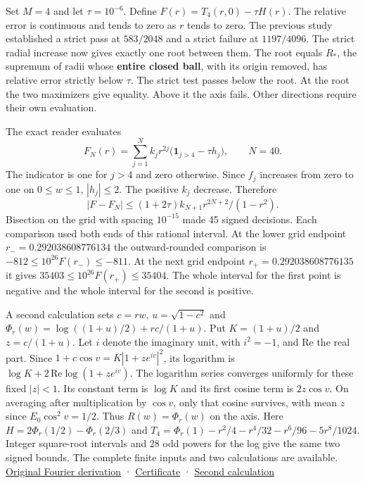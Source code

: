 Set \(M=4\) and let \(\tau=10^{-6}\). Define \(F(r)=T_4(r,0)-\tau H(r)\). The relative error is continuous and tends to zero as \(r\) tends to zero. The previous study established a strict pass at \(583/2048\) and a strict failure at \(1197/4096\). The strict radial increase now gives exactly one root between them. The root equals \(R_*\), the supremum of radii whose \textbf{entire closed ball}, with its origin removed, has relative error strictly below \(\tau\). The strict test passes below the root. At the root the two maximizers give equality. Above it the axis fails. Other directions require their own evaluation.

The exact reader evaluates \[
F_N(r)=\sum_{j=1}^{N} k_j r^{2j}\bigl(\mathbf{1}_{j>4}-\tau h_j\bigr),\qquad N=40 .
\] The indicator is one for \(j>4\) and zero otherwise. Since \(f_j\) increases from zero to one on \(0\le w\le1\), \(|h_j|\le2\). The positive \(k_j\) decrease. Therefore \[
|F-F_N|\le (1+2\tau)k_{N+1}r^{2N+2}/(1-r^2).
\] Bisection on the grid with spacing \(10^{-15}\) made 45 signed decisions. Each comparison used both ends of this rational interval. At the lower grid endpoint \(r_-=0.292038608776134\) the outward-rounded comparison is \(-812\le 10^{26}F(r_-)\le-811\). At the next grid endpoint \(r_+=0.292038608776135\) it gives \(35403\le 10^{26}F(r_+)\le35404\). The whole interval for the first point is negative and the whole interval for the second is positive.

A second calculation sets \(c=rw\), \(u=\sqrt{1-c^2}\) and \(\Phi_r(w)=\log((1+u)/2)+rc/(1+u)\). Put \(K=(1+u)/2\) and \(z=c/(1+u)\). Let \(i\) denote the imaginary unit, with \(i^2=-1\), and \(\mathrm{Re}\) the real part. Since \(1+c\cos v=K|1+ze^{iv}|^2\), its logarithm is \(\log K+2\,\mathrm{Re}\log(1+ze^{iv})\). The logarithm series converges uniformly for these fixed \(|z|<1\). Its constant term is \(\log K\) and its first cosine term is \(2z\cos v\). On averaging after multiplication by \(\cos v\), only that cosine survives, with mean \(z\) since \(E_0\cos^2v=1/2\). Thus \(R(w)=\Phi_r(w)\) on the axis. Here \(H=2\Phi_r(1/2)-\Phi_r(2/3)\) and \(T_4=\Phi_r(1)-r^2/4-r^4/32-r^6/96-5r^8/1024\). Integer square-root intervals and 28 odd powers for the log give the same two signed bounds. The complete finite inputs and two calculations are available. \href{https://github.com/sepahead/pid-rs/blob/main/audit/archive/angular-relative-bound-20261005/derivation.md.txt}{Original Fourier derivation} · \href{https://github.com/sepahead/pid-rs/blob/main/audit/research/angular-truncation-extremum/certificate.json}{Certificate} · \href{https://github.com/sepahead/pid-rs/blob/main/audit/research/angular-truncation-extremum/closed_form.py}{Second calculation}

